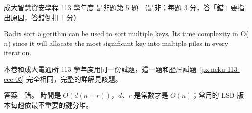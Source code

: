 \begin{pastexam}[label={px:ncku-113-isec-05}]{成大智慧資安學程 113 學年度 是非題第 5 題}
（是非；每題 3 分，答「錯」要指出原因，答錯倒扣 1 分）

Radix sort algorithm can be used to sort multiple keys. Its time complexity in O($n$) since it
will allocate the most significant key into multiple piles in every iteration.
\end{pastexam}

\begin{pastsoln}
本卷和成大電通所 113 學年度用同一份試題，這一題和歷屆試題~\ref{px:ncku-113-cce-05} 完全相同，完整的詳解見該題。

答案：錯。 時間是 $\Theta(d(n + r))$，$d$、$r$ 是常數才是 $O(n)$；常用的 LSD 版本每趟依最不重要的鍵分堆。
\end{pastsoln}
